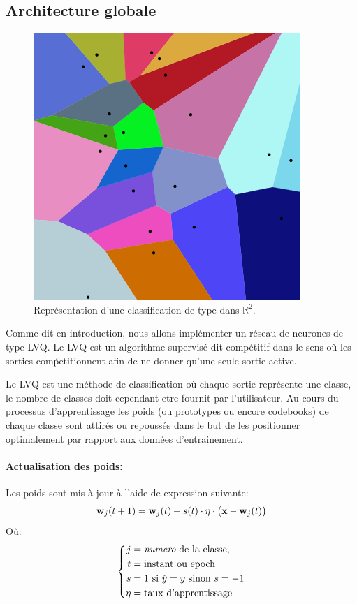 \documentclass[11pt]{article}
\begin{document}
\subsection{Architecture globale}
\begin{figure}[htp]
	\centering
	\includegraphics[scale=.5]{img/tesselation.png}
	\caption{Repr\'esentation d'une classification de type dans $\mathbb{R}^2$.}
\end{figure}

Comme dit en introduction, nous allons impl\'ementer un r\'eseau de neurones
de type LVQ. Le LVQ est un algorithme supervis\'e dit comp\'etitif dans le sens
o\`u les sorties com\'petitionnent afin de ne donner qu'une seule sortie active. 

Le LVQ est une m\'ethode de classification o\`u chaque sortie repr\'esente une
classe, le nombre de classes doit cependant etre fournit par l'utilisateur.
Au cours du processus d'apprentissage les poids (ou prototypes ou encore
codebooks) de chaque classe sont attir\'es ou repouss\'es
dans le but de les positionner optimalement par rapport aux donn\'ees
d'entrainement.


\paragraph{Actualisation des poids:} Les poids sont mis \`a jour  \`a l'aide
de expression suivante:\\
\begin{equation}
	\begin{aligned}
		{\bf w}_j (t+1) &= {\bf w}_j (t) + s(t) \cdot \eta\cdot
		\big({\bf x} - {\bf w}_j (t)\big)\\
	\end{aligned}
\end{equation}
O\`u: 
\begin{equation}
	\left\{
	\begin{aligned}
		j &= \text{{\em numero} de la classe,} \\ t &= \text{instant ou epoch} \\
		s &= 1 \text{ si } {\hat y} = y \text{ sinon } s= -1\\
		\eta &= \text{taux d'apprentissage}
	\end{aligned}
	\right .
\end{equation}
\end{document}
